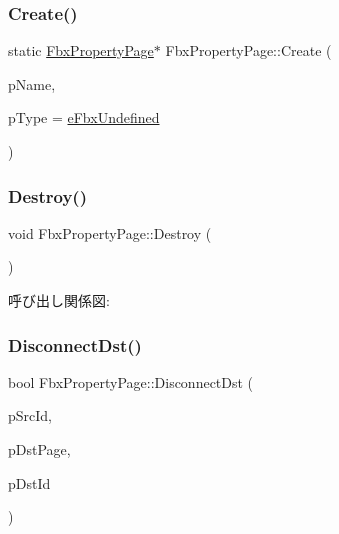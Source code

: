 \subsubsection{\texorpdfstring{Create()}{Create()}\hspace{0.1cm}{\footnotesize\ttfamily [3/3]}}
{\footnotesize\ttfamily static \hyperlink{class_fbx_property_page}{Fbx\+Property\+Page}$\ast$ Fbx\+Property\+Page\+::\+Create (\begin{DoxyParamCaption}\item[{const char $\ast$}]{p\+Name,  }\item[{\hyperlink{fbxpropertytypes_8h_a73913a5ddfb20e57c6f25e9e6784bd92}{E\+Fbx\+Type}}]{p\+Type = {\ttfamily \hyperlink{fbxpropertytypes_8h_a73913a5ddfb20e57c6f25e9e6784bd92a150b400dddd0f8b5c7e22a1bba0721d8}{e\+Fbx\+Undefined}} }\end{DoxyParamCaption})\hspace{0.3cm}{\ttfamily [static]}}

\mbox{\label{class_fbx_property_page_a4c1d17d6237f93017d6171c575d59c7c}} 
\subsubsection{\texorpdfstring{Destroy()}{Destroy()}}
{\footnotesize\ttfamily void Fbx\+Property\+Page\+::\+Destroy (\begin{DoxyParamCaption}{ }\end{DoxyParamCaption})}

呼び出し関係図\+:
\mbox{\label{class_fbx_property_page_a1954d1f34ba38a2a4bbc208650206e22}} 
\subsubsection{\texorpdfstring{Disconnect\+Dst()}{DisconnectDst()}}
{\footnotesize\ttfamily bool Fbx\+Property\+Page\+::\+Disconnect\+Dst (\begin{DoxyParamCaption}\item[{\hyperlink{fbxtypes_8h_a088fa96de3b0b3ea69f0f6afef525dfb}{Fbx\+Int}}]{p\+Src\+Id,  }\item[{\hyperlink{class_fbx_property_page}{Fbx\+Property\+Page} $\ast$}]{p\+Dst\+Page,  }\item[{\hyperlink{fbxtypes_8h_a088fa96de3b0b3ea69f0f6afef525dfb}{Fbx\+Int}}]{p\+Dst\+Id }\end{DoxyParamCaption})}

